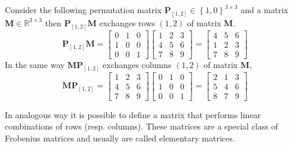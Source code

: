 		\begin{example}
			Consider the following permutation matrix $\bm{P}_{[1,2]}\in\left\lbrace 1,0\right\rbrace^{3\times 3}$
			and a matrix $\bm{M}\in\mathbb{R}^{3\times 3}$ then $\bm{P}_{[1,2]}\bm{M}$ exchanges
			rows $(1,2)$ of matrix $\bm{M}$.
			\begin{equation}
			 	\bm{P}_{[1,2]}\bm{M} = 
			 	\begin{bmatrix}
			 		0 & 1 & 0 \\
			 		1 & 0 & 0 \\
			 		0 & 0 & 1 
			 	\end{bmatrix}
			 	\begin{bmatrix}
			 		1 & 2 & 3 \\
			 		4 & 5 & 6 \\
			 		7 & 8 & 9
			 	\end{bmatrix}
			 	= 
			 	\begin{bmatrix}
			 		4 & 5 & 6 \\
			 		1 & 2 & 3 \\
			 		7 & 8 & 9
			 	\end{bmatrix}
			\end{equation}
			In the same way $\bm{M}\bm{P}_{[1,2]}$ exchanges columns $(1,2)$ of matrix $\bm{M}$,
			\begin{equation}
			 	\bm{M}\bm{P}_{[1,2]} = 
			 	\begin{bmatrix}
			 		1 & 2 & 3 \\
			 		4 & 5 & 6 \\
			 		7 & 8 & 9
			 	\end{bmatrix}
			 	\begin{bmatrix}
			 		0 & 1 & 0 \\
			 		1 & 0 & 0 \\
			 		0 & 0 & 1 
			 	\end{bmatrix}
			 	= 
			 	\begin{bmatrix}
			 		2 & 1 & 3 \\
			 		5 & 4 & 6 \\
			 		8 & 7 & 9
			 	\end{bmatrix}
			\end{equation}
			
		\end{example}
		In analogous way it is possible to define a matrix that performs linear combinations of rows (resp. columns). These matrices are a special class of Frobenius matrices and usually are called elementary matrices. 
